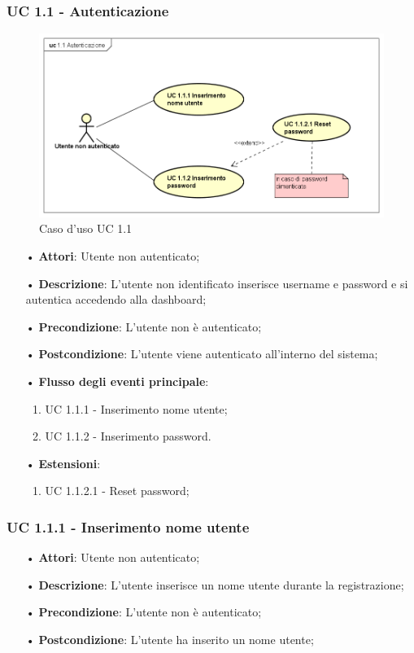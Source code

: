 \subsubsection{UC 1.1 - Autenticazione}
\begin{figure}[H]
\centering
\includegraphics[width=17cm]{img/UC11.png} 
\caption{Caso d'uso UC 1.1}\label{fig:11}
\end{figure}
\begin{itemize}
\item[•]\textbf{Attori}: Utente non autenticato;
\item[•]\textbf{Descrizione}:  L’utente non identificato inserisce username e password e si autentica accedendo alla dashboard;
\item[•]\textbf{Precondizione}: L’utente non è autenticato;
\item[•]\textbf{Postcondizione}: L’utente viene autenticato all’interno del sistema;
\item[•]\textbf{Flusso degli eventi principale}:
\begin{enumerate}
\item UC 1.1.1 - Inserimento nome utente;
\item UC 1.1.2 - Inserimento password.
\end{enumerate}
\item[•]\textbf{Estensioni}:
\begin{enumerate}
\item UC 1.1.2.1 - Reset password;

\end{enumerate}
\end{itemize}

\subsubsection{UC 1.1.1 - Inserimento nome utente}
\begin{itemize}
\item[•]\textbf{Attori}: Utente non autenticato;
\item[•]\textbf{Descrizione}: L’utente inserisce un nome utente durante la registrazione;
\item[•]\textbf{Precondizione}: L’utente non è autenticato;
\item[•]\textbf{Postcondizione}: L’utente ha inserito un nome utente;
\end{itemize}

